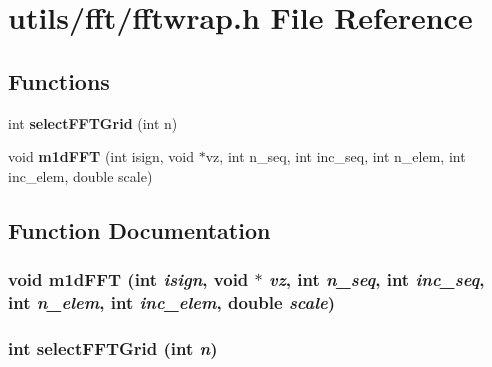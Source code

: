\section{utils/fft/fftwrap.h File Reference}
\label{fftwrap_8h}
\subsection*{Functions}
\begin{CompactItemize}
\item 
int {\bf select\-FFTGrid} (int n)
\item 
void {\bf m1d\-FFT} (int isign, void $\ast$vz, int n\_\-seq, int inc\_\-seq, int n\_\-elem, int inc\_\-elem, double scale)
\end{CompactItemize}


\subsection{Function Documentation}
\subsubsection{\setlength{\rightskip}{0pt plus 5cm}void m1d\-FFT (int {\em isign}, void $\ast$ {\em vz}, int {\em n\_\-seq}, int {\em inc\_\-seq}, int {\em n\_\-elem}, int {\em inc\_\-elem}, double {\em scale})}\label{fftwrap_8h_86ed7d309a06f95717a0afd0fa5a0d94}


\subsubsection{\setlength{\rightskip}{0pt plus 5cm}int select\-FFTGrid (int {\em n})}\label{fftwrap_8h_6cf3832e181ea8cd27f85932fdcb9682}


